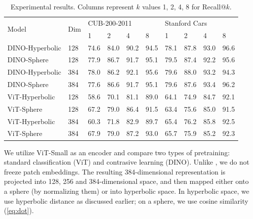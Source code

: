 \documentclass[10pt, letterpaper, twocolumn]{article}
\begin{document}
\begin{table}[t!]
    \centering
    \begin{tabular}{l|l|llll|llll}
    \multirow{2}{*}{Model} & \multirow{2}{*}{Dim} & \multicolumn{4}{l|}{CUB-200-2011}  & \multicolumn{4}{l}{Stanford Cars} \\
                           &                      & 1    & 2    & 4    & 8    & 1      & 2      & 4      & 8      \\ \hline
    DINO-Hyperbolic        & 128                  & 74.6 & 84.0 & 90.2 & 94.5 & 78.1   & 87.8   & 93.0   & 96.6   \\
    DINO-Sphere            & 128                  & 77.9 & 86.7 & 91.7 & 95.1 & 79.5   & 87.4   & 92.2   & 95.6   \\
    DINO-Hyperbolic        & 384                  & 78.0 & 86.2 & 92.1 & 95.6 & 79.6   & 88.0   & 93.2   & 94.3   \\
    DINO-Sphere            & 384                  & 77.6 & 86.6 & 91.7 & 95.1 & 79.6   & 87.6   & 93.4   & 96.2   \\ \hline
    ViT-Hyperbolic         & 128                  & 58.6   & 70.1   & 81.1   & 89.0   & 64.1   & 74.9   & 84.7   & 92.1   \\
    ViT-Sphere             & 128                  & 67.2   & 79.0   & 86.4   & 91.5   & 63.4   & 75.6   & 85.0   & 91.5   \\
    ViT-Hyperbolic         & 384                  & 60.3   & 71.8   & 82.9   & 89.7   & 65.4   & 76.2   & 85.8   & 92.5   \\
    ViT-Sphere             & 384                  & 67.9   & 79.0   & 87.2   & 93.0   & 65.7   & 75.9   & 85.2   & 92.3
    \end{tabular}
    \caption{Experimental results. Columns represent $k$ values 1, 2, 4, 8 for Recall@$k$.}
    \label{tab:results}
\end{table}

We utilize ViT-Small as an encoder and compare two types of pretraining: standard classification (ViT) and contrasive learning (DINO). Unlike \cite{ermolov_hyperbolic_2022}, we do not freeze patch embeddings. The resulting 384-dimensional representation is projected into 128, 256 and 384-dimensional space, and then mapped either onto a sphere (by normalizing them) or into hyperbolic space. In hyperbolic space, we use hyperbolic distance as discussed earlier; on a sphere, we use cosine similarity (\ref{eq:dot}).
\end{document}
